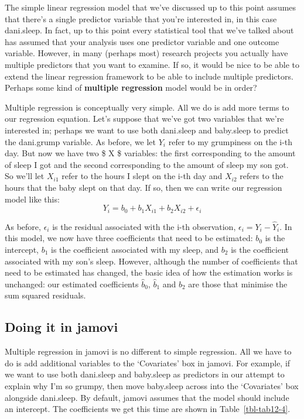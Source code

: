 \documentclass[
  a4paper,
]{book}
\begin{document}
The simple linear regression model that we've discussed up to this point
assumes that there's a single predictor variable that you're interested
in, in this case dani.sleep. In fact, up to this point every statistical
tool that we've talked about has assumed that your analysis uses one
predictor variable and one outcome variable. However, in many (perhaps
most) research projects you actually have multiple predictors that you
want to examine. If so, it would be nice to be able to extend the linear
regression framework to be able to include multiple predictors. Perhaps
some kind of \textbf{multiple regression} model would be in order?

Multiple regression is conceptually very simple. All we do is add more
terms to our regression equation. Let's suppose that we've got two
variables that we're interested in; perhaps we want to use both
dani.sleep and baby.sleep to predict the dani.grump variable. As before,
we let \(Y_{i}\) refer to my grumpiness on the i-th day. But now we have
two \$ X \$ variables: the first corresponding to the amount of sleep I
got and the second corresponding to the amount of sleep my son got. So
we'll let \(X_{i1}\) refer to the hours I slept on the i-th day and
\(X_{i2}\) refers to the hours that the baby slept on that day. If so,
then we can write our regression model like this:
\[Y_i=b_0+b_1X_{i1}+b_2X_{i2}+\epsilon_i\]

As before, \(\epsilon_i\) is the residual associated with the i-th
observation, \(\epsilon_i = Y_i - \hat{Y}_i\). In this model, we now
have three coefficients that need to be estimated: \(b_0\) is the
intercept, \(b_1\) is the coefficient associated with my sleep, and
\(b_2\) is the coefficient associated with my son's sleep. However,
although the number of coefficients that need to be estimated has
changed, the basic idea of how the estimation works is unchanged: our
estimated coefficients \(\hat{b}_0\), \(\hat{b}_1\) and \(\hat{b}_2\)
are those that minimise the sum squared residuals.

\hypertarget{doing-it-in-jamovi}{%
\subsection{Doing it in jamovi}\label{doing-it-in-jamovi}}

Multiple regression in jamovi is no different to simple regression. All
we have to do is add additional variables to the `Covariates' box in
jamovi. For example, if we want to use both dani.sleep and baby.sleep as
predictors in our attempt to explain why I'm so grumpy, then move
baby.sleep across into the `Covariates' box alongside dani.sleep. By
default, jamovi assumes that the model should include an intercept. The
coefficients we get this time are shown in Table~\ref{tbl-tab12-4}.
\end{document}
